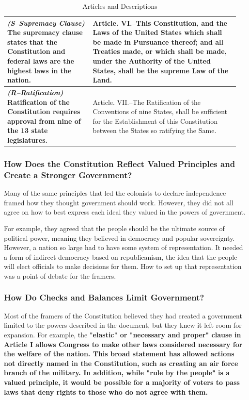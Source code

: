 \begin{center}
\begin{table}[htbp]
\begin{tabular}{ p{0.35\linewidth} | p{0.6\linewidth} }
			\bf{\it{(S–Supremacy Clause)}} The supremacy clause states that the Constitution and federal laws are the highest laws
			in the nation. & Article. VI.–This Constitution, and the Laws of the United States which shall be made in Pursuance thereof;
			and all Treaties made, or which shall be made, under the Authority of the United States, shall be the supreme Law of the Land.
			\\ \hline
			\bf{\it{(R–Ratification)}} Ratification of the Constitution requires approval from nine of the 13 state legislatures. &
			Article. VII.–The Ratification of the Conventions of nine States, shall be sufficient for the Establishment of this
			Constitution between the States so ratifying the Same. \\ \hline
		\end{tabular}

		\caption{Articles and Descriptions}
		\label{table:articles-and-descriptions}
	\end{table}
\end{center}

\newpage

\subsubsection*{How Does the Constitution Reflect Valued Principles and Create a Stronger Government?}

Many of the same principles that led the colonists to declare independence framed how they thought government should work. However, they
did not all agree on how to best express each ideal they valued in the powers of government.

For example, they agreed that the people should be the ultimate source of political power, meaning they believed in democracy and popular
sovereignty. However, a nation so large had to have some system of representation. It needed a form of indirect democracy based on
republicanism, the idea that the people will elect officials to make decisions for them. How to set up that representation was a point of
debate for the framers.

\subsubsection*{How Do Checks and Balances Limit Government?}

Most of the framers of the Constitution believed they had created a government limited to the powers described in the document, but they
knew it left room for expansion. For example, the \bf{"elastic"} or \bf{"necessary and proper"} clause in Article I allows Congress
to make other laws considered necessary for the welfare of the nation. This broad statement has allowed actions not directly named in the
Constitution, such as creating an air force branch of the military. In addition, while \bf{"rule by the people"} is a valued principle,
it would be possible for a majority of voters to pass laws that deny rights to those who do not agree with them.

